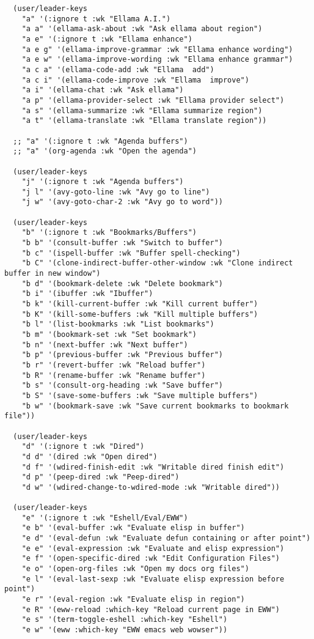 \documentclass[11pt]{article}
\begin{document}
\begin{verbatim}
  (user/leader-keys
    "a" '(:ignore t :wk "Ellama A.I.")
    "a a" '(ellama-ask-about :wk "Ask ellama about region")
    "a e" '(:ignore t :wk "Ellama enhance")
    "a e g" '(ellama-improve-grammar :wk "Ellama enhance wording")
    "a e w" '(ellama-improve-wording :wk "Ellama enhance grammar")
    "a c a" '(ellama-code-add :wk "Ellama  add")
    "a c i" '(ellama-code-improve :wk "Ellama  improve")
    "a i" '(ellama-chat :wk "Ask ellama")
    "a p" '(ellama-provider-select :wk "Ellama provider select")
    "a s" '(ellama-summarize :wk "Ellama summarize region")
    "a t" '(ellama-translate :wk "Ellama translate region"))

  ;; "a" '(:ignore t :wk "Agenda buffers")
  ;; "a" '(org-agenda :wk "Open the agenda")

  (user/leader-keys
    "j" '(:ignore t :wk "Agenda buffers")
    "j l" '(avy-goto-line :wk "Avy go to line")
    "j w" '(avy-goto-char-2 :wk "Avy go to word"))

  (user/leader-keys
    "b" '(:ignore t :wk "Bookmarks/Buffers")
    "b b" '(consult-buffer :wk "Switch to buffer")
    "b c" '(ispell-buffer :wk "Buffer spell-checking")
    "b C" '(clone-indirect-buffer-other-window :wk "Clone indirect buffer in new window")
    "b d" '(bookmark-delete :wk "Delete bookmark")
    "b i" '(ibuffer :wk "Ibuffer")
    "b k" '(kill-current-buffer :wk "Kill current buffer")
    "b K" '(kill-some-buffers :wk "Kill multiple buffers")
    "b l" '(list-bookmarks :wk "List bookmarks")
    "b m" '(bookmark-set :wk "Set bookmark")
    "b n" '(next-buffer :wk "Next buffer")
    "b p" '(previous-buffer :wk "Previous buffer")
    "b r" '(revert-buffer :wk "Reload buffer")
    "b R" '(rename-buffer :wk "Rename buffer")
    "b s" '(consult-org-heading :wk "Save buffer")
    "b S" '(save-some-buffers :wk "Save multiple buffers")
    "b w" '(bookmark-save :wk "Save current bookmarks to bookmark file"))

  (user/leader-keys
    "d" '(:ignore t :wk "Dired")
    "d d" '(dired :wk "Open dired")
    "d f" '(wdired-finish-edit :wk "Writable dired finish edit")
    "d p" '(peep-dired :wk "Peep-dired")
    "d w" '(wdired-change-to-wdired-mode :wk "Writable dired"))

  (user/leader-keys
    "e" '(:ignore t :wk "Eshell/Eval/EWW")    
    "e b" '(eval-buffer :wk "Evaluate elisp in buffer")
    "e d" '(eval-defun :wk "Evaluate defun containing or after point")
    "e e" '(eval-expression :wk "Evaluate and elisp expression")
    "e f" '(open-specific-dired :wk "Edit Configuration Files")
    "e o" '(open-org-files :wk "Open my docs org files")
    "e l" '(eval-last-sexp :wk "Evaluate elisp expression before point")
    "e r" '(eval-region :wk "Evaluate elisp in region")
    "e R" '(eww-reload :which-key "Reload current page in EWW")
    "e s" '(term-toggle-eshell :which-key "Eshell")
    "e w" '(eww :which-key "EWW emacs web wowser"))


\end{verbatim}
\end{document}
